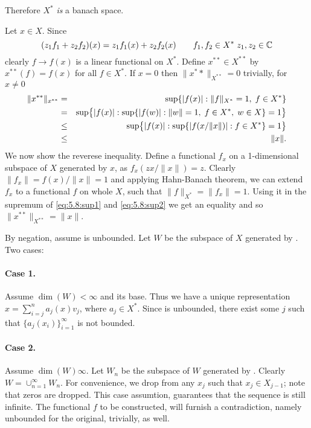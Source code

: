 \begin{enumerate}
\begin{itemize}
 Therefore \(X^*\) \emph{is} a banach space.
 
  Let \(x\in X\). Since
 \[(z_1f_1+z_2f_2)(x) = z_1f_1(x) + z_2f_2(x)
   \qquad f_1,f_2\in X^*\;z_1,z_2\in \mathbb{C}\]
 clearly \(f\to f(x)\) is a linear functional on \(X^*\).
 Define \(x^{**}\in X^{**}\) by \(x^{**}(f) = f(x)\) for all \(f\in X^*\).
 If \(x=0\) then \(\|x^**\|_{X^{**}} = 0\) trivially, for \(x\neq 0\)
 \begin{eqnarray}
 \|x^{**}\|_{x^{**}} 
 &=& \sup\{|f(x)|: \|f\|_{X^*} = 1,\;f\in X^*\} \notag \\
 &=& \sup\bigl\{|f(x)|: \sup\{ |f(w)|: \|w\|=1,\; f\in X^*,\;w\in X\}=1\bigr\} 
     \notag \\
 &\leq& \sup\bigl\{|f(x)|: \sup\{ |f(x/\|x\|)|: f\in X^*\}=1\bigr\} 
        \label{eq:5.8:sup1} \\
 &\leq& \|x\| \label{eq:5.8:sup2}.
 \end{eqnarray}
 We now show the reverese inequality. Define a functional \(f_x\)
 on a 1-dimensional subspace of $X$ generated by $x$, as \(f_x(zx/\|x\|) = z\).
 Clearly \(\|f_x\| = f(x)/\|x\| = 1\)
 and applying Hahn-Banach theorem, we can extend
 \(f_x\) to a functional $f$ on whole $X$, such that 
 \(\|f\|_{X^*} = \|f_x\| = 1\).
 Using it in the supremum of \eqref{eq:5.8:sup1} and \eqref{eq:5.8:sup2} 
 we get an equality and so \(\|x^{**}\|_{X^{**}} = \|x\|\).
 
 By negation, assume  is unbounded.
 Let $W$ be the subspace of $X$ generated by .
 Two cases:

 \paragraph{Case 1.} Assume \(\dim(W) < \infty\) and  its base.
 Thus we have a unique representation 
 \(x = \sum_{i=j}^n a_j(x) v_j\), where \(a_j\in X^*\).
 Since  is unbounded, there exist some $j$ such that
 \(\{a_j(x_i)\}_{i=1}^\infty\) is not bounded.

 \paragraph{Case 2.} Assume \(\dim(W)\infty\). 
 Let \(W_n\) be the subspace of $W$ generated by .
 Clearly \(W = \cup_{n=1}^\infty W_n\).
 For convenience, we drop from  any \(x_j\) such that 
 \(x_j \in X_{j-1}\); note that zeros are dropped. 
 This case assumtion, guarantees that the sequence is still infinite.
 The functional $f$ to be constructed, 
 will furnish a contradiction, namely  unbounded for 
 the original, trivially, as well.


\end{itemize}
\end{enumerate}
